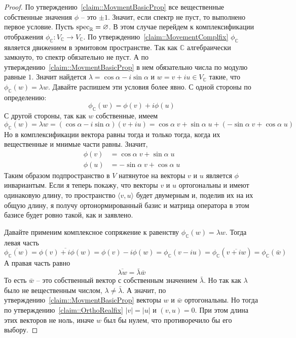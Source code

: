 \begin{proof}
По утверждению~\ref{claim::MovmentBasicProp} все вещественные собственные значения $\phi$ -- это $\pm 1$. Значит, если спектр не пуст, то выполнено первое условие. Пусть $\operatorname{spec}_\mathbb R= \varnothing$. В этом случае перейдем к комплексификации отображения $\phi_\mathbb C\colon V_\mathbb C\to V_\mathbb C$. По утверждению~\ref{claim::MovementComplfix} $\phi_\mathbb C$ является движением в эрмитовом пространстве. Так как $\mathbb C$ алгебраически замкнуто, то спектр обязательно не пуст. А по утверждению~\ref{claim::MovmentBasicProp} в нем обязательно числа по модулю равные $1$. Значит найдется $\lambda = \cos \alpha - i \sin \alpha$ и $w= v + i u\in V_\mathbb C$ такие, что $\phi_\mathbb C(w) = \lambda w$. Давайте распишем эти условия более явно. С одной стороны по определению:
\[
\phi_\mathbb C(w) = \phi(v) + i\phi(u)
\]
С другой стороны, так как $w$ собственные, имеем
\[
\phi_\mathbb C(w) = \lambda w = (\cos \alpha - i \sin \alpha) (v+ i u) = \cos \alpha \;v + \sin \alpha\; u + (-\sin \alpha\; v +\cos\alpha\; u)
\]
Но в комплексификации вектора равны тогда и только тогда, когда их вещественные и мнимые части равны. Значит,
\begin{align*}
\phi(v) &= \cos \alpha\; v + \sin \alpha\; u\\
\phi(u) &= -\sin \alpha\; v +\cos\alpha\; u
\end{align*}
Таким образом подпространство в $V$ натянутое на векторы $v$ и $u$ является $\phi$ инвариантым. Если я теперь покажу, что векторы $v$ и $u$ ортогональны и имеют одинаковую длину, то пространство $\langle v,u\rangle$ будет двумерным и, поделив их на их общую длину, я получу ортонормированный базис и матрица оператора в этом базисе будет ровно такой, как и заявлено.

Давайте применим комплексное сопряжение к равенству $\phi_\mathbb C(w) = \lambda w$. Тогда левая часть
\[
\overline{\phi_\mathbb C(w)} = \overline{\phi(v) + i \phi(w)} = \phi(v) - i \phi(w) = \phi_\mathbb C(v - iu) = \phi_\mathbb C(\overline{v + i w}) = \phi_\mathbb C(\bar w)
\]
А правая часть равно
\[
\overline{\lambda w} = \bar \lambda \bar w
\]
То есть $\bar w$ -- это собственный вектор с собственным значением $\bar \lambda$. Но так как $\lambda$ было не вещественным числом, $\lambda \neq \bar\lambda$. А значит, по утверждению~\ref{claim::MovmentBasicProp} векторы $w$ и $\bar w$ ортогональны. Но тогда по утверждению~\ref{claim::OrthoRealfix} $|v| = |u|$ и $(v, u) = 0$. При этом длина этих векторов не ноль, иначе $w$ был бы нулем, что противоречило бы его выбору.

\end{proof}

